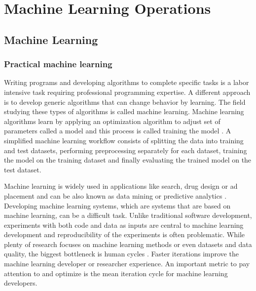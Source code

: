 \chapter{Machine Learning Operations}
\label{chap:mloper}


\section{Machine Learning} %
\label{sec:ml}

\subsection{Practical machine learning}

Writing programs and developing algorithms to complete specific tasks is a labor intensive task requiring professional programming expertise.
A different approach is to develop generic algorithms that can change behavior by learning.
The field studying these types of algorithms is called machine learning.
Machine learning algorithms learn by applying an optimization algorithm to adjust set of parameters called a model and this process is called training the model \parencite{lecunDeepLearning2015}. %
A simplified machine learning workflow consists of splitting the data into training and test datasets, performing preprocessing separately for each dataset, training the model on the training dataset and finally evaluating the trained model on the test dataset.  %


Machine learning is widely used in applications like search, drug design or ad placement and can be also known as data mining or predictive analytics \parencite{domingosFewUsefulThings2012}. Developing machine learning systems, which are systems that are based on machine learning, can be a difficult task. Unlike traditional software development, experiments with both code and data as inputs are central to machine learning development \parencite{zahariaAcceleratingMachineLearning2018} and reproducibility of the experiments is often problematic. While plenty of research focuses on machine learning methods or even datasets and data quality, the biggest bottleneck is human cycles \parencite{domingosFewUsefulThings2012}. Faster iterations improve the machine learning developer or researcher experience. An important metric to pay attention to and optimize is the mean iteration cycle for machine learning developers.

